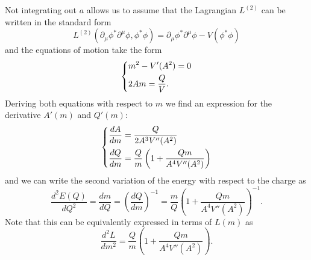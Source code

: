 \documentclass[11pt]{article}
\numberwithin{equation}{section}
\newcommand*{\del}{\partial}
\begin{document}
Not integrating out \(a\) allows us to assume that the Lagrangian \(L^{(2)}\) can be written in the standard form
\begin{equation}
   L^{(2)}(\del_{\mu} \phi^{*} \del^{\mu} \phi, \phi^{*} \phi )  =  \del_{\mu} \phi^{*} \del^{\mu} \phi - V( \phi^{*} \phi )
\end{equation}
and the equations of motion take the form
\begin{equation}
  \begin{dcases}
    m^2 - V'(A^2) = 0 \\
    2 A m = \frac{Q}{V} .
  \end{dcases}
\end{equation}
Deriving both equations with respect to \(m\) we find an expression for the derivative \(A'(m)\) and \(Q' (m)\):
\begin{equation}
  \begin{dcases}
    \frac{dA}{dm} = \frac{Q}{2 A^3 V''(A^2)} \\
    \frac{dQ}{dm} = \frac{Q}{m}\left( 1+ \frac{Q m}{A^4 V''(A^2)}  \right)
  \end{dcases}
\end{equation}
and we can write the second variation of the energy with respect to the charge as
\begin{equation}
  \frac{d^2 E(Q)}{dQ^2} = \frac{d m}{dQ} = \left(  \frac{dQ}{dm} \right)^{-1} = \frac{m}{Q}\left( 1+ \frac{Q m}{A^4 V''(A^2)}  \right)^{-1}.
\end{equation}
Note that this can be equivalently expressed in terms of \(L(m)\) as
\begin{equation}
  \frac{d^2L}{d m^2} =  \frac{Q}{m}\left( 1+ \frac{Q m}{A^4 V''(A^2)}  \right).
\end{equation}
\end{document}
